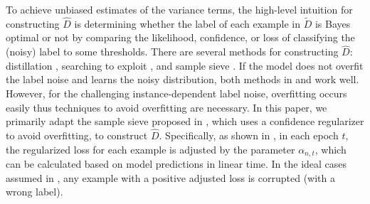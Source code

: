 \documentclass[final]{cvpr}
\newcommand{\estD}{{\hat D}}
\newcommand{\rev}[1]{{\color{blue}#1}}
\newcommand{\rev}[1]{#1}
\begin{document}
To achieve unbiased estimates of the variance terms, the high-level intuition for constructing $\estD$ is determining whether the label of each example in $\widetilde D$ is Bayes optimal or not by comparing the likelihood, confidence, or loss of classifying the (noisy) label to some thresholds.
There are several methods for constructing $\estD$: distillation \cite{cheng2017learningdistill}, searching to exploit \cite{yao2020searching}, and sample sieve \cite{sieve2020}.
If the model does not overfit the label noise and learns the noisy distribution, both methods in \cite{cheng2017learningdistill} and \cite{yao2020searching} work well. However, for the challenging instance-dependent label noise, overfitting occurs easily thus techniques to avoid overfitting are necessary. In this paper, we primarily adapt the sample sieve proposed in \cite{sieve2020}, which uses a confidence regularizer to avoid overfitting, to construct $\estD$. 
{Specifically, as shown in \cite{sieve2020}, in each epoch $t$, the regularized loss for each example is adjusted by the parameter $\alpha_{n,t}$, which \rev{can be calculated based on model predictions in linear time}. In the ideal cases assumed in \cite{sieve2020}, any example with a positive adjusted loss is corrupted (with a wrong label).}
\end{document}
